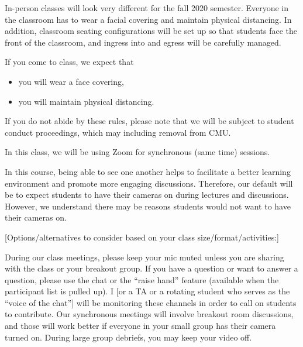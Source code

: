 \begin{gram}
In-person classes will look very different for the fall 2020 semester. Everyone in the classroom has to wear a facial covering and maintain physical distancing. 
%
In addition, classroom seating configurations will be set up so that students face the front of the classroom, and ingress into and egress will be carefully managed. 

If you come to class, we expect that 
\begin{itemize}
\item you will wear a face covering,

\item you will maintain physical distancing.
\end{itemize}
%

If you do not abide by these rules, please note that we will 
be subject to student conduct proceedings, which may including removal from CMU. 
\end{gram}



\begin{gram}
In this class, we will be using Zoom for synchronous (same time) sessions.

In this course, being able to see one another helps to facilitate a better learning environment and promote more engaging discussions. Therefore, our default will be to expect students to have their cameras on during lectures and discussions. 
%
However, we understand there may be reasons students would not want to have their cameras on.

[Options/alternatives to consider based on your class size/format/activities:]

During our class meetings, please keep your mic muted unless you are sharing with the class or your breakout group. 
If you have a question or want to answer a question, please use the chat or the “raise hand” feature (available when the participant list is pulled up). I [or a TA or a rotating student who serves as the “voice of the chat”] will be monitoring these channels in order to call on students to contribute.
Our synchronous meetings will involve breakout room discussions, and those will work better if everyone in your small group has their camera turned on. During large group debriefs, you may keep your video off. 
\end{gram}

